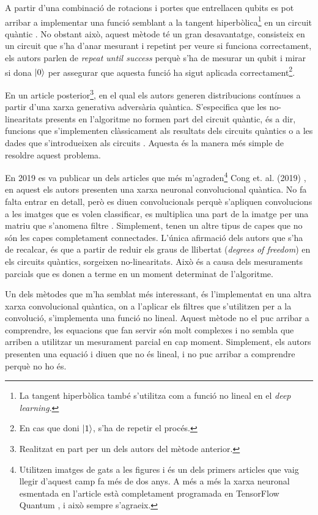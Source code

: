 A partir d'una combinació de rotacions i portes que entrellacen qubits es pot arribar a implementar una funció semblant a la tangent hiperbòlica\footnote{La tangent hiperbòlica també s'utilitza com a funció no lineal en el \textit{deep learning}.} en un circuit quàntic \cite{cao2017quantum}. No obstant això, aquest mètode té un gran desavantatge, consisteix en un circuit que s'ha d'anar mesurant i repetint per veure si funciona correctament, els autors parlen de \textit{repeat until success} perquè s'ha de mesurar un qubit i mirar si dona $\ket{0}$ per assegurar que aquesta funció ha sigut aplicada correctament\footnote{En cas que doni $\ket{1}$, s'ha de repetir el procés.}.

En un article posterior\footnote{Realitzat en part per un dels autors del mètode anterior.}, en el qual els autors generen distribucions contínues a partir d'una xarxa generativa adversària quàntica.
S'especifica que les no-linearitats presents en l'algoritme no formen part del circuit quàntic, és a dir, funcions que s'implementen clàssicament als resultats dels circuits quàntics o a les dades que s'introdueixen als circuits \cite{romero2019variational}. Aquesta és la manera més simple de resoldre aquest problema. 

En 2019 es va publicar un dels articles que més m'agraden\footnote{Utilitzen imatges de gats a les figures i és un dels primers articles que vaig llegir d'aquest camp fa més de dos anys. A més a més la xarxa neuronal esmentada en l'article està completament programada en TensorFlow Quantum \cite{tfq}, i això sempre s'agraeix. } Cong et. al. (2019) \cite{cong2019convolucional}, en aquest els autors presenten una xarxa neuronal convolucional quàntica. No fa falta entrar en detall, però es diuen convolucionals perquè s'apliquen convolucions a les imatges que es volen classificar, es multiplica una part de la imatge per una matriu que s'anomena filtre \cite{CNN}. Simplement, tenen un altre tipus de capes que no són les capes completament connectades. L'única afirmació dels autors que s'ha de recalcar, és que a partir de reduir els graus de llibertat (\textit{degrees of freedom}) en els circuits quàntics, sorgeixen no-linearitats. Això és a causa dels mesuraments parcials que es donen a terme en un moment determinat de l'algoritme.

Un dels mètodes que m'ha semblat més interessant, és l'implementat en una altra xarxa convolucional quàntica, on a l'aplicar els filtres que s'utilitzen per a la convolució, s'implementa una funció no lineal. Aquest mètode no el puc arribar a comprendre, les equacions que fan servir són molt complexes i no sembla que arriben a utilitzar un mesurament parcial en cap moment. Simplement, els autors presenten una equació i diuen que no és lineal, i no puc arribar a comprendre perquè no ho és.

